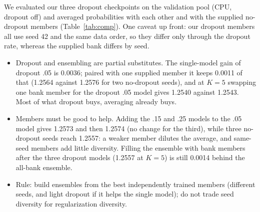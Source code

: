 We evaluated our three dropout checkpoints on the validation pool (CPU, dropout off) and averaged probabilities with each other and with the supplied no-dropout members (Table~\ref{tab:comp}). One caveat up front: our dropout members all use seed 42 and the same data order, so they differ only through the dropout rate, whereas the supplied bank differs by seed.
\begin{itemize}
\item Dropout and ensembling are partial substitutes. The single-model gain of dropout .05 is 0.0036; paired with one supplied member it keeps 0.0011 of that (1.2564 against 1.2576 for two no-dropout seeds), and at $K=5$ swapping one bank member for the dropout .05 model gives 1.2540 against 1.2543. Most of what dropout buys, averaging already buys.
\item Members must be good to help. Adding the .15 and .25 models to the .05 model gives 1.2573 and then 1.2574 (no change for the third), while three no-dropout seeds reach 1.2557: a weaker member dilutes the average, and same-seed members add little diversity. Filling the ensemble with bank members after the three dropout models (1.2557 at $K=5$) is still 0.0014 behind the all-bank ensemble.
\item Rule: build ensembles from the best independently trained members (different seeds, and light dropout if it helps the single model); do not trade seed diversity for regularization diversity.
\end{itemize}

